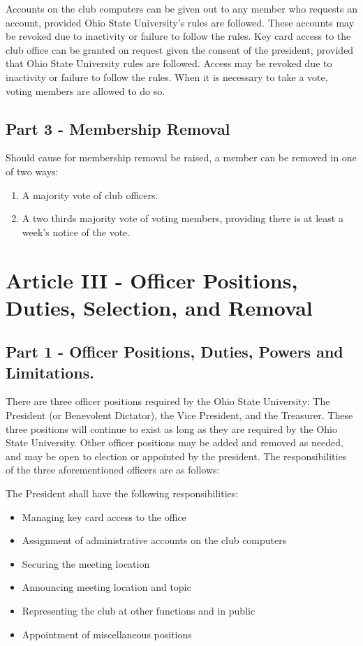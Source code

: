 \documentclass{article}
\begin{document}
	Accounts on the club computers can be given out to any member who requests an account, provided Ohio State University's rules are followed.  These accounts may be revoked due to inactivity or failure to follow the rules.  Key card access to the club office can be granted on request given the consent of the president, provided that Ohio State University rules are followed.  Access may be revoked due to inactivity or failure to follow the rules.
	When it is necessary to take a vote, voting members are allowed to do so.

	\subsection{Part 3 - Membership Removal}

	Should cause for membership removal be raised, a member can be removed in one of two ways:
	\begin{enumerate}
		\item A majority vote of club officers.
		\item A two thirds majority vote of voting members, providing there is at least a week's notice of the vote.
	\end{enumerate}

	\section{Article III - Officer Positions, Duties, Selection, and Removal}

	\subsection{Part 1 - Officer Positions, Duties, Powers and Limitations.}

	There are three officer positions required by the Ohio State University: The President (or Benevolent Dictator), the Vice President, and the Treasurer.  These three positions will continue to exist as long as they are required by the Ohio State University. Other officer positions may be added and removed as needed, and may be open to election or appointed by the president. The responsibilities of the three aforementioned officers are as follows:

	The President shall have the following responsibilities:

	\begin{itemize}
		\item Managing key card access to the office
		\item Assignment of administrative accounts on the club computers
		\item Securing the meeting location
		\item Announcing meeting location and topic
		\item Representing the club at other functions and in public
		\item Appointment of miscellaneous positions
	\end{itemize}
\end{document}
